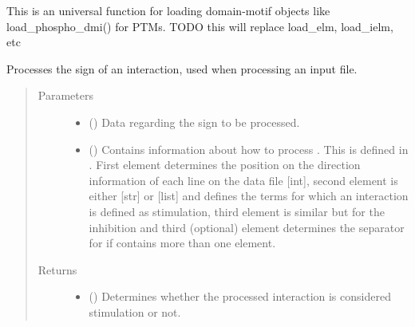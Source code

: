 \documentclass[letterpaper,10pt,english]{sphinxmanual}
\begin{document}
\begin{fulllineitems}

\begin{fulllineitems}
\label{\detokenize{main:pypath.main.PyPath.process_dmi}}
This is an universal function
for loading domain-motif objects
like load\_phospho\_dmi() for PTMs.
TODO this will replace load\_elm, load\_ielm, etc

\end{fulllineitems}


\begin{fulllineitems}
\label{\detokenize{main:pypath.main.PyPath.process_sign}}
Processes the sign of an interaction, used when processing an
input file.
\begin{quote}\begin{description}
\item[{Parameters}] \leavevmode\begin{itemize}
\item {} 
 () \textendash{} Data regarding the sign to be processed.

\item {} 
 () \textendash{} Contains information about how to process . This
is defined in . First element
determines the position on the direction information of each
line on the data file {[}int{]}, second element is either {[}str{]}
or {[}list{]} and defines the terms for which an interaction is
defined as stimulation, third element is similar but for the
inhibition and third (optional) element determines the
separator for  if contains more than one element.

\end{itemize}

\item[{Returns}] \leavevmode
\begin{itemize}
\item {} 
() \textendash{} Determines whether the processed interaction
is considered stimulation or not.


\end{itemize}
\end{description}
\end{quote}
\end{fulllineitems}
\end{fulllineitems}
\end{document}
